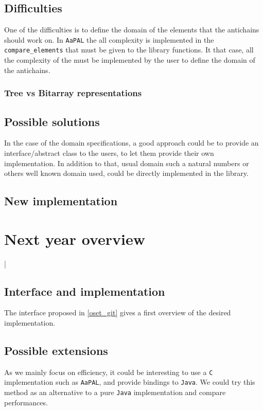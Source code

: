 \documentclass[letterpaper]{article}
\theoremstyle{definition}
\begin{document}
\subsection{Difficulties}


One of the difficulties is to define the domain of the elements that
the antichains should work on. In \texttt{AaPAL} the all complexity
is implemented in the \texttt{compare\_elements} that must be given
to the library functions. It that case, all the complexity of the
must be implemented by the user to define the domain of the antichains.

\subsubsection{Tree vs Bitarray representations}


\subsection{Possible solutions}

In the case of the domain specifications, a good approach could be to
provide an interface/abstract class to the users, to let them provide
their own implementation. In addition to that, usual domain such a
natural numbers or others well known domain used, could be directly
implemented
in the library.


\subsection{New implementation}


\section{Next year overview}

\label{conclusion}

|\subsection{Interface and implementation}

The interface proposed in \ref{oset_git} gives a first overview
of the desired implementation.


\subsection{Possible extensions}


As we mainly focus on efficiency, it could be interesting to use a \texttt{C}
implementation such as \texttt{AaPAL},
and provide bindings to \texttt{Java}. We could try
this method as an alternative to a pure \texttt{Java} implementation and
compare performances.





\end{document}
